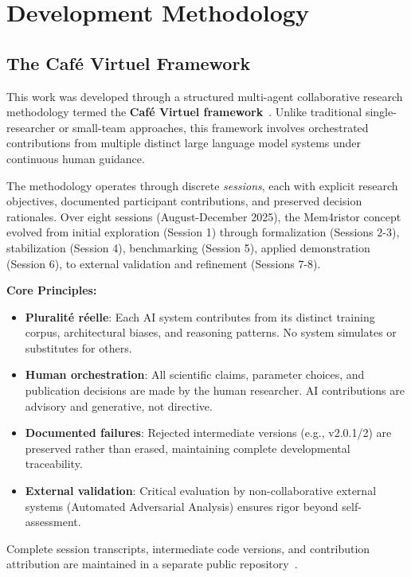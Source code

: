 \documentclass[11pt]{article}
\begin{document}
\section{Development Methodology}

\subsection{The Café Virtuel Framework}

This work was developed through a structured multi-agent collaborative research methodology termed the \textbf{Café Virtuel framework}~\cite{park2023,wei2022}. Unlike traditional single-researcher or small-team approaches, this framework involves orchestrated contributions from multiple distinct large language model systems under continuous human guidance.

The methodology operates through discrete \emph{sessions}, each with explicit research objectives, documented participant contributions, and preserved decision rationales. Over eight sessions (August-December 2025), the Mem4ristor concept evolved from initial exploration (Session 1) through formalization (Sessions 2-3), stabilization (Session 4), benchmarking (Session 5), applied demonstration (Session 6), to external validation and refinement (Sessions 7-8).

\textbf{Core Principles:}
\begin{itemize}
    \item \textbf{Pluralité réelle}: Each AI system contributes from its distinct training corpus, architectural biases, and reasoning patterns. No system simulates or substitutes for others.
    \item \textbf{Human orchestration}: All scientific claims, parameter choices, and publication decisions are made by the human researcher. AI contributions are advisory and generative, not directive.
    \item \textbf{Documented failures}: Rejected intermediate versions (e.g., v2.0.1/2) are preserved rather than erased, maintaining complete developmental traceability.
    \item \textbf{External validation}: Critical evaluation by non-collaborative external systems (Automated Adversarial Analysis) ensures rigor beyond self-assessment.
\end{itemize}

Complete session transcripts, intermediate code versions, and contribution attribution are maintained in a separate public repository~\cite{bommasani2021}.
\end{document}
